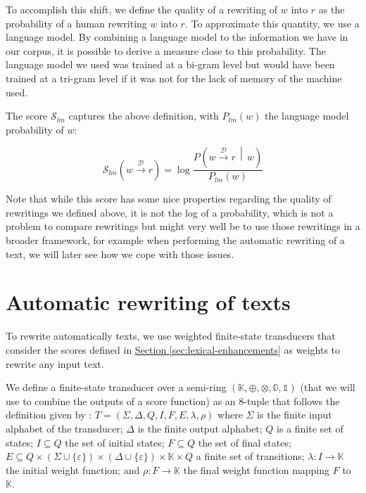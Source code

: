 \documentclass[a4paper, 11pt, onepage]{scrreprt}
\newcommand\sectionref[1]{\hyperref[#1]{Section \ref*{#1}}}
\newcommand\maps[1]{\xrightarrow{\mathcal{#1}}}
\newcommand\given{\, \middle| \,}
\newcommand\proba[2][]{P_{#1} \left( #2 \right)}
\begin{document}
To accomplish this shift, we define the quality of a rewriting of $w$
into $r$ as the probability of a human rewriting $w$ into $r$. To
approximate this quantity, we use a language model. By combining a
language model to the information we have in our corpus, it is
possible to derive a measure close to this probability. The language
model we used was trained at a bi-gram level but would have been
trained at a tri-gram level if it was not for the lack of memory of
the machine used.

The score $\mathcal{S}_{lm}$ captures the above definition, with
$\proba[lm]{w}$ the language model probability of $w$:

\begin{equation*}
  \mathcal{S}_{lm}(w \maps{D} r) = \log \frac{\proba{w \maps{D} r \given
      w}}{\proba[lm]{w}}
\end{equation*}

Note that while this score has some nice properties regarding the
quality of rewritings we defined above, it is not the log of a
probability, which is not a problem to compare rewritings but might
very well be to use those rewritings in a broader framework, for
example when performing the automatic rewriting of a text, we will
later see how we cope with those issues.

\section{Automatic rewriting of texts}
\label{sec:rewriting}

To rewrite automatically texts, we use weighted finite-state
transducers that consider the scores defined
in \sectionref{sec:lexical-enhancements} as weights to rewrite any
input text.

We define a finite-state transducer over a semi-ring $(\mathbb{K},
\oplus, \otimes, \mathbb{0}, \mathbb{1})$ (that we will use to combine
the outputs of a score function) as an 8-tuple that follows the
definition given by \cite{mohri2004weighted}: $T = (\Sigma, \Delta, Q,
I, F, E, \lambda, \rho)$ where $\Sigma$ is the finite input alphabet
of the transducer; $\Delta$ is the finite output alphabet; $Q$ is a
finite set of states; $I \subseteq Q$ the set of initial states; $F
\subseteq Q$ the set of final states; $E \subseteq Q \times (\Sigma
\cup \{\varepsilon\}) \times (\Delta \cup \{\varepsilon\}) \times
\mathbb{K} \times Q$ a finite set of transitions; $λ : I \rightarrow
\mathbb{K}$ the initial weight function; and $ρ : F \rightarrow
\mathbb{K}$ the final weight function mapping $F$ to $\mathbb{K}$.
\end{document}
